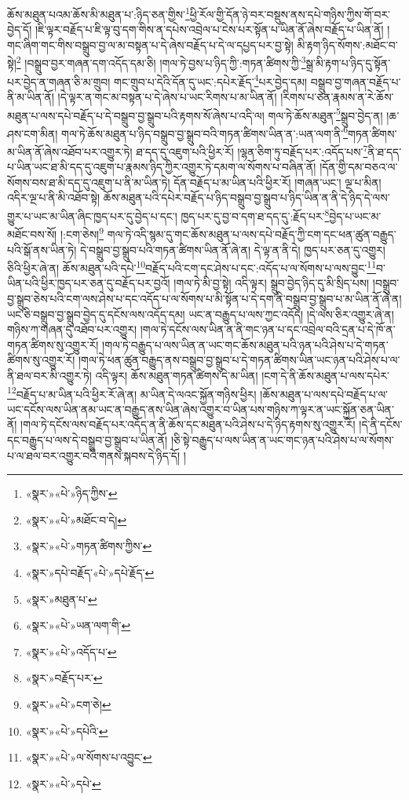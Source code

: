 ཆོས་མཐུན་པའམ་ཆོས་མི་མཐུན་པ་:ཉིད་ཅན་གྱིས་\footnote{«སྣར་»«པེ་»ཉིད་ཀྱིས་}ཕྱི་རོལ་གྱི་དོན་ཉེ་བར་བསྡུས་ནས་དཔེ་གཉིས་ཀྱིས་གོ་བར་བྱེད་དོ། །ཇི་ལྟར་བརྗོད་པ་ཇི་ལྟ་བུ་དག་གིས་ན་དཔེས་འབྲེལ་པ་ངེས་པར་སྟོན་པ་ཡིན་ནོ་ཞེས་བརྗོད་པ་ཡིན་ནོ། །གང་ཞིག་གང་གིས་བསྒྲུབ་བྱ་ལ་མ་བསྟན་པ་དེ་ཞེས་བརྗོད་པ་དེ་ལ་དཔྱད་པར་བྱ་སྟེ། མི་རྟག་ཉིད་སོགས་:མཐོང་བ་སྟེ།\footnote{«སྣར་»«པེ་»མཐོང་བ་དེ།} །བསྒྲུབ་བྱར་གཞན་དག་འདོད་དམ་ཅི། །གལ་ཏེ་བྱས་པ་ཉིད་ཀྱི་:གཏན་ཚིགས་ཀྱི་\footnote{«སྣར་»«པེ་»གཏན་ཚིགས་ཀྱིས་}སྒྲ་མི་རྟག་པ་ཉིད་དུ་སྟོན་པར་བྱེད་ན་གཞན་ཅི་མ་གྲུབ། གང་གྲུབ་པ་དེའི་དོན་དུ་ཡང་:དཔེར་རྗོད་\footnote{«སྣར་»དཔེ་བརྗོད་«པེ་»དཔེ་རྗོད་}པར་བྱེད་དམ། བསྒྲུབ་བྱ་གཞན་བརྗོད་པ་ནི་མ་ཡིན་ནོ། །དེ་ལྟར་ན་གང་མ་བསྟན་པ་དེ་ཞེས་པ་ཡང་རིགས་པ་མ་ཡིན་ནོ། །རིགས་པ་ཅན་རྣམས་ན་རེ་ཆོས་མཐུན་པ་ལས་དཔེ་བརྗོད་པ་དེ་བསྒྲུབ་བྱ་སྒྲུབ་པའི་རྟགས་སོ་ཞེས་པ་འདི་ལ། གལ་ཏེ་ཆོས་མཐུན་\footnote{«སྣར་»མཐུན་པ་}སྒྲུབ་བྱེད་ན། །ཆ་ཤས་ངག་མིན། གལ་ཏེ་ཆོས་མཐུན་པ་ཉིད་བསྒྲུབ་བྱ་སྒྲུབ་བའི་གཏན་ཚིགས་ཡིན་ན་:ཡན་ལག་ནི་\footnote{«སྣར་»«པེ་»ཡན་ལག་གི་}གཏན་ཚིགས་མ་ཡིན་ནོ་ཞེས་འཐོབ་པར་འགྱུར་ཏེ། ཐ་དད་དུ་འཇུག་པའི་ཕྱིར་རོ། །ལྷན་ཅིག་ཏུ་བརྗོད་པར་:འདོད་པས་\footnote{«སྣར་»«པེ་»འདོད་པ་}ནི་ཐ་དད་པ་ཡིན་ཡང་ཐ་མི་དད་དུ་འཇུག་པ་རྣམས་ཉིད་ཀྱིར་འགྱུར་ཏེ་དམག་ལ་སོགས་པ་བཞིན་ནོ། །དོན་གྱི་དམ་བཅའ་ལ་སོགས་བས་ཐ་མི་དད་དུ་འཇུག་པ་ནི་མ་ཡིན་ཏེ། དོན་བརྗོད་པ་མ་ཡིན་པའི་ཕྱིར་རོ། །གཞན་ཡང་། ལྔ་པ་མིན། འདིར་ལྔ་པ་ནི་མི་འཐོབ་སྟེ། ཆོས་མཐུན་པའི་དཔེར་བརྗོད་པ་ཉིད་བསྒྲུབ་བྱ་སྒྲུབ་པ་ཉིད་ཡིན་ན་ནི་དེ་ཉིད་དེ་ལས་གྱུར་པ་ཡང་མ་ཡིན་ཞིང་ཁྱད་པར་དུ་བྱེད་པ་དང་། ཁྱད་པར་དུ་བྱ་བ་དག་ཐ་དད་དུ་:རྗོད་པར་\footnote{«སྣར་»བརྗོད་པར་}བྱེད་པ་ཡང་མ་མཐོང་བས་སོ། །:ངག་ཅེས།\footnote{«སྣར་»«པེ་»ངག་ཅེ།} གལ་ཏེ་འདི་སྙམ་དུ་གང་ཆོས་མཐུན་པ་ལས་དཔེ་བརྗོད་ཀྱི་ངག་དང་ཕན་ཚུན་བརྒྱུད་པའི་སྒོ་ནས་ཡིན་ཏེ། དེ་བསྒྲུབ་བྱ་སྒྲུབ་པའི་གཏན་ཚིགས་ཡིན་ནོ་ཞེ་ན། དེ་ལྟ་ན་ནི་དེ། ཁྱད་པར་ཅན་དུ་འགྱུར། ཅིའི་ཕྱིར་ཞེ་ན། ཆོས་མཐུན་པའི་དཔེ་\footnote{«སྣར་»«པེ་»དཔེའི་}བརྗོད་པའི་ངག་དང་ཤེས་པ་དང་:འདོད་པ་ལ་སོགས་པ་ལས་བྱུང་\footnote{«སྣར་»«པེ་»ལ་སོགས་པ་འབྱུང་}བ་ཡིན་པའི་ཕྱིར་ཁྱད་པར་ཅན་དུ་བརྗོད་པར་བྱའོ། །གལ་ཏེ་མི་བྱ་སྟེ། འདི་ལྟར། སྒྲུབ་བྱེད་ཉིད་དུ་མི་སྲིད་པས། །བསྒྲུབ་བྱ་སྒྲུབ་ཅེས་པའི་ངག་ལས་ཤེས་པ་དང་འདོད་པ་ལ་སོགས་པ་མི་སྟོན་པ་དེ་དག་ནི་བསྒྲུབ་བྱ་སྒྲུབ་པ་མ་ཡིན་ནོ་ཞེ་ན། ཡང་ཅི་བསྒྲུབ་བྱ་སྒྲུབ་བྱེད་དུ་དངོས་ལས་འདོད་དམ། ཡང་ན་བརྒྱུད་པ་ལས་ཀྱང་འདོད། །དེ་ལས་ཅིར་འགྱུར་ཞེ་ན། གཉིས་ཀ་གཞན་དུ་འཐོབ་པར་འགྱུར། །གལ་ཏེ་དངོས་ལས་ཡིན་ན་ནི་གང་ཉན་པ་དང་འབྲེལ་བའི་དྲན་པ་དེ་ཁོ་ན་གཏན་ཚིགས་སུ་འགྱུར་རོ། །གལ་ཏེ་བརྒྱུད་པ་ལས་ཡིན་ན་ཡང་གང་ཆོས་མཐུན་པའི་ཉན་པའི་ཤེས་པ་དེ་གཏན་ཚིགས་སུ་འགྱུར་རོ། །གལ་ཏེ་ཕན་ཚུན་བརྒྱུད་ནས་བསྒྲུབ་བྱ་སྒྲུབ་པ་དེ་གཏན་ཚིགས་ཡིན་ཡང་ཉན་པའི་ཤེས་པ་ལ་ནི་ཐལ་བར་མི་འགྱུར་ཏེ། འདི་ལྟར། ཆོས་མཐུན་གཏན་ཚིགས་དེ་མ་ཡིན། །ངག་དེ་ནི་ཆོས་མཐུན་པ་ལས་དཔེར་\footnote{«སྣར་»«པེ་»དཔེ་}བརྗོད་པ་མ་ཡིན་པའི་ཕྱིར་རོ་ཞེ་ན། མ་ཡིན་དེ་ལའང་སྐྱོན་གཉིས་ཕྱིར། །ཆོས་མཐུན་པ་ལས་དཔེ་བརྗོད་པ་ལ་ཡང་དངོས་ལས་ཡིན་ནམ་ཡང་ན་བརྒྱུད་ནས་ཡིན་ཞེས་འགྱུར་བ་ཡིན་པས་གཉིས་ཀ་ལྟར་ན་ཡང་སྐྱོན་ཅན་ཡིན་ནོ། །གལ་ཏེ་དངོས་ལས་བརྗོད་པར་འདོད་ན་ནི་ཆོས་དང་མཐུན་པའི་ཤེས་པ་དེ་ཉིད་རྟགས་སུ་འགྱུར་རོ། །དེ་ནི་དངོས་དང་བརྒྱུད་པ་ལས་དེ་བསྒྲུབ་བྱ་སྒྲུབ་པ་ཡིན་ནོ། །ཅི་སྟེ་བརྒྱུད་པ་ལས་ཡིན་ན་ཡང་གང་ཉན་པའི་ཤེས་པ་ལ་སོགས་པ་ལ་ཐལ་བར་འགྱུར་བའི་གནས་སྐབས་དེ་ཉིད་དོ། །
